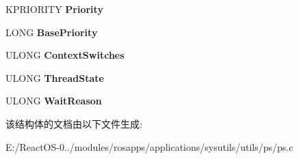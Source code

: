 \begin{DoxyCompactItemize}
K\+P\+R\+I\+O\+R\+I\+TY {\bfseries Priority}
\item 
\mbox{\label{struct___s_y_s_t_e_m___t_h_r_e_a_d_s_a7560e127c7ef89966257777cab461725}} 
L\+O\+NG {\bfseries Base\+Priority}
\item 
\mbox{\label{struct___s_y_s_t_e_m___t_h_r_e_a_d_s_afd145dd4bc2c6e50e949a17976fc5901}} 
U\+L\+O\+NG {\bfseries Context\+Switches}
\item 
\mbox{\label{struct___s_y_s_t_e_m___t_h_r_e_a_d_s_aa7be42d73062b6b325cb88f10f69b519}} 
U\+L\+O\+NG {\bfseries Thread\+State}
\item 
\mbox{\label{struct___s_y_s_t_e_m___t_h_r_e_a_d_s_afc3dbcff06929e3647216bd47ea671b0}} 
U\+L\+O\+NG {\bfseries Wait\+Reason}
\end{DoxyCompactItemize}


该结构体的文档由以下文件生成\+:\begin{DoxyCompactItemize}
\item 
E\+:/\+React\+O\+S-\/0../modules/rosapps/applications/sysutils/utils/ps/ps.\+c\end{DoxyCompactItemize}
